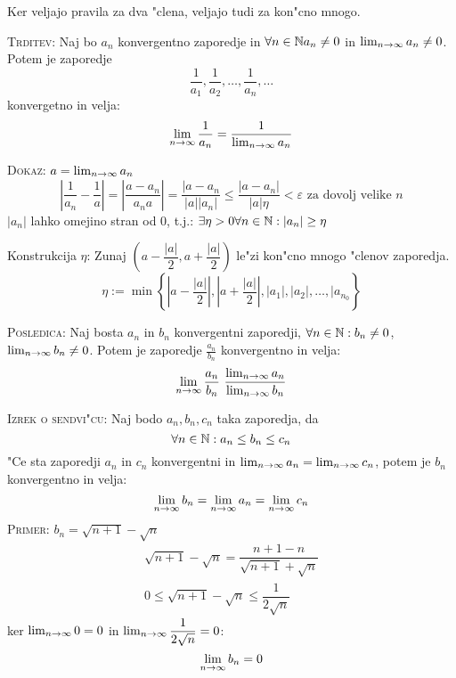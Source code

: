 Ker veljajo pravila za dva "clena, veljajo tudi za kon"cno mnogo.

\textsc{Trditev:} Naj bo $a_n$ konvergentno zaporedje in $\forall n \in \mathbb{N} a_n \neq 0$ in $\lim_{n \rightarrow \infty} a_n \neq 0$. Potem je zaporedje
\begin{equation*}
\dfrac{1}{a_1}, \dfrac{1}{a_2}, \ldots, \dfrac{1}{a_n}, \ldots
\end{equation*}
konvergetno in velja:
\begin{equation*}
\lim_{n \rightarrow \infty} \dfrac{1}{a_n} = \dfrac{1}{\lim_{n \rightarrow \infty} a_n}
\end{equation*}

\textsc{Dokaz:} $a = \lim_{n \rightarrow \infty} a_n$
\begin{equation*}
\left|\dfrac{1}{a_n} - \dfrac{1}{a}\right| = \left|\dfrac{a - a_n}{a_n a}\right| = \dfrac{|a - a_n}{|a||a_n|} \leq \dfrac{|a - a_n|}{|a| \eta} < \varepsilon \text{ za dovolj velike $n$}
\end{equation*}
$|a_n|$ lahko omejino stran od 0, t.j.: $\exists \eta > 0 \forall n \in \mathbb{N}: |a_n| \geq \eta$

Konstrukcija $\eta$: Zunaj $\left(a - \dfrac{|a|}{2}, a + \dfrac{|a|}{2}\right)$ le"zi kon"cno mnogo "clenov zaporedja.
\begin{equation*}
\eta := \min \left\{\left|a - \dfrac{|a|}{2}\right|, \left|a + \dfrac{|a|}{2}\right|, |a_1|, |a_2|, \ldots, |a_{n_0}  \right\}
\end{equation*}

\textsc{Posledica:} Naj bosta $a_n$ in $b_n$ konvergentni zaporedji, $\forall n \in \mathbb{N}: b_n \neq 0$, $\lim_{n \rightarrow \infty} b_n \neq 0$. Potem je zaporedje $\frac{a_n}{b_n}$ konvergentno in velja:
\begin{equation*}
\lim_{\toinf{n}}\dfrac{a_n}{b_n} \ \dfrac{\lim_{\toinf{n}} a_n}{\lim_{\toinf{n}}b_n}
\end{equation*}

\textsc{Izrek o sendvi"cu:} Naj bodo $a_n, b_n, c_n$ taka zaporedja, da 
\begin{equation*}
\forall n \in \mathbb{N}: a_n \leq b_n \leq c_n
\end{equation*}
"Ce sta zaporedji $a_n$ in $c_n$ konvergentni in $\lim_{n \rightarrow \infty} a_n = \lim_{n \rightarrow \infty}c_n$, potem je $b_n$ konvergentno in velja:
\begin{equation*}
\lim_{n \rightarrow \infty} b_n = \lim_{n \rightarrow \infty} a_n = \lim_{n \rightarrow \infty} c_n
\end{equation*}
\textsc{Primer:} $b_n = \sqrt{n+1} - \sqrt{n}$
\begin{gather*}
\sqrt{n+1} - \sqrt{n} = \dfrac{n+1 - n}{\sqrt{n+1} + \sqrt{n}}\\
0 \leq \sqrt{n+1} - \sqrt{n} \leq \dfrac{1}{2\sqrt{n}}
\end{gather*}
ker $\lim_{n \rightarrow \infty} 0 = 0$ in $\lim_{n \rightarrow \infty} \dfrac{1}{2\sqrt{n}} = 0$:
\begin{equation*}
\lim_{n \rightarrow \infty} b_n = 0
\end{equation*}

